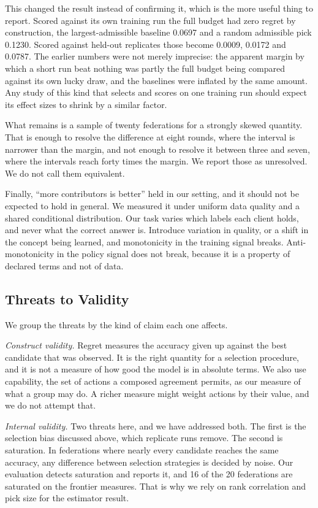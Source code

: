 \documentclass[10pt,conference]{IEEEtran}
\begin{document}
This changed the result instead of confirming it, which is the more useful
thing to report. Scored against its own training run the full budget had zero
regret by construction, the largest-admissible baseline 0.0697 and a random
admissible pick 0.1230. Scored against held-out replicates those become 0.0009,
0.0172 and 0.0787. The earlier numbers were not merely imprecise: the apparent
margin by which a short run beat nothing was partly the full budget being
compared against its own lucky draw, and the baselines were inflated by the
same amount. Any study of this kind that selects and scores on one training run
should expect its effect sizes to shrink by a similar factor.

What remains is a sample of twenty federations for a strongly skewed quantity.
That is enough to resolve the difference at eight rounds, where the interval is
narrower than the margin, and not enough to resolve it between three and seven,
where the intervals reach forty times the margin. We report those as
unresolved. We do not call them equivalent.

Finally, ``more contributors is better'' held in our setting, and it should not
be expected to hold in general. We measured it under uniform data quality and a
shared conditional distribution. Our task varies which labels each client
holds, and never what the correct answer is. Introduce variation in quality, or
a shift in the concept being learned, and monotonicity in the training signal
breaks. Anti-monotonicity in the policy signal does not break, because it is a
property of declared terms and not of data.

\subsection{Threats to Validity}

We group the threats by the kind of claim each one affects.

\emph{Construct validity.} Regret measures the accuracy given up against the
best candidate that was observed. It is the right quantity for a selection
procedure, and it is not a measure of how good the model is in absolute terms.
We also use capability, the set of actions a composed agreement permits, as our
measure of what a group may do. A richer measure might weight actions by their
value, and we do not attempt that.

\emph{Internal validity.} Two threats here, and we have addressed both. The
first is the selection bias discussed above, which replicate runs remove. The
second is saturation. In federations where nearly every candidate reaches the
same accuracy, any difference between selection strategies is decided by noise.
Our evaluation detects saturation and reports it, and 16 of the 20 federations
are saturated on the frontier measures. That is why we rely on rank
correlation and pick size for the estimator result.
\end{document}
